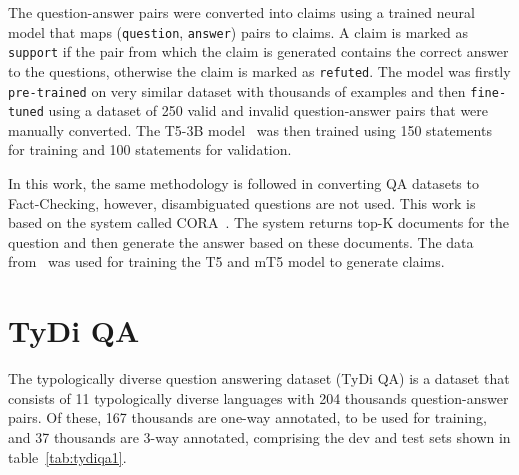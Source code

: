 The question-answer pairs were converted into claims using a trained neural model that maps (\texttt{question}, \texttt{answer}) pairs to claims. A claim is marked as \texttt{support} if the pair from which the claim is generated contains the correct answer to the questions, otherwise the claim is marked as \texttt{refuted}. The model was firstly \texttt{pre-trained} on very similar dataset with thousands of examples and then \texttt{fine-tuned} using a dataset of 250 valid and invalid question-answer pairs that were manually converted. The T5-3B model~\cite{T5} was then trained using 150 statements for training and 100 statements for validation.

In this work, the same methodology is followed in converting QA datasets to Fact-Checking, however, disambiguated questions are not used. This work is based on the system called CORA~\cite{mDPR}. The system returns top-K documents for the question and then generate the answer based on these documents. The data from~\cite{faviq} was used for training the T5 and mT5 model to generate claims.


\section{TyDi QA}
The typologically diverse question answering dataset (TyDi QA) \cite{tydiqa} is a dataset that consists of 11 typologically diverse languages with 204 thousands question-answer pairs. Of these, 167 thousands are one-way annotated, to be used for training, and 37 thousands are 3-way annotated, comprising the dev and test sets shown in table~\ref{tab:tydiqa1}.

